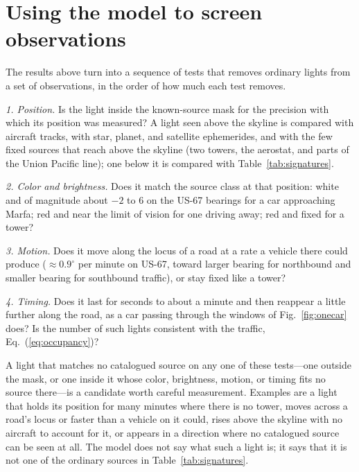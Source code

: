 \documentclass[aip,jap,amsmath,amssymb,reprint,floatfix]{revtex4-2}
\begin{document}
\section{Using the model to screen observations}\label{sec:screening}

The results above turn into a sequence of tests that removes ordinary lights from a set of observations, in the order of how much each test removes.

\textit{1. Position.} Is the light inside the known-source mask for the precision with which its position was measured? A light seen above the skyline is compared with aircraft tracks, with star, planet, and satellite ephemerides, and with the few fixed sources that reach above the skyline (two towers, the aerostat, and parts of the Union Pacific line); one below it is compared with Table~\ref{tab:signatures}.

\textit{2. Color and brightness.} Does it match the source class at that position: white and of magnitude about $-2$ to 6 on the US-67 bearings for a car approaching Marfa; red and near the limit of vision for one driving away; red and fixed for a tower?

\textit{3. Motion.} Does it move along the locus of a road at a rate a vehicle there could produce ($\approx0.9^\circ$ per minute on US-67, toward larger bearing for northbound and smaller bearing for southbound traffic), or stay fixed like a tower?

\textit{4. Timing.} Does it last for seconds to about a minute and then reappear a little further along the road, as a car passing through the windows of Fig.~\ref{fig:onecar} does? Is the number of such lights consistent with the traffic, Eq.~(\ref{eq:occupancy})?

A light that matches no catalogued source on any one of these tests---one outside the mask, or one inside it whose color, brightness, motion, or timing fits no source there---is a candidate worth careful measurement. Examples are a light that holds its position for many minutes where there is no tower, moves across a road's locus or faster than a vehicle on it could, rises above the skyline with no aircraft to account for it, or appears in a direction where no catalogued source can be seen at all. The model does not say what such a light is; it says that it is not one of the ordinary sources in Table~\ref{tab:signatures}.
\end{document}
